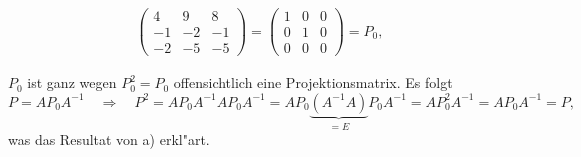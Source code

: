 \begin{loesung}
\begin{teilaufgaben}
\begin{align*}
\begin{pmatrix}
 4& 9& 8\\
-1&-2&-1\\
-2&-5&-5
\end{pmatrix}
=
\begin{pmatrix}
1&0&0\\
0&1&0\\
0&0&0
\end{pmatrix}
=P_0,
\end{align*}
\item
$P_0$ ist ganz wegen
$P_0^2=P_0$
offensichtlich eine Projektionsmatrix.
Es folgt
\[
P=AP_0A^{-1}
\quad\Rightarrow\quad
P^2
=
AP_0A^{-1} AP_0A^{-1}
=
AP_0\underbrace{(A^{-1} A)}_{\displaystyle =E}P_0A^{-1}
=
AP_0^2A^{-1}
=
AP_0A^{-1}
=
P,
\]
was das Resultat von a) erkl"art.
\qedhere
\end{teilaufgaben}
\end{loesung}

